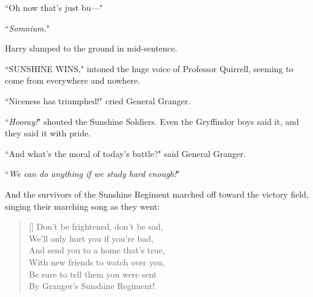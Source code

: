 ``Oh now that's just bu—"

``\emph{Somnium.}"

Harry slumped to the ground in mid-sentence.

``SUNSHINE WINS," intoned the huge voice of Professor Quirrell, seeming to come from everywhere and nowhere.

``Niceness has triumphed!" cried General Granger.

``\emph{Hooray!}" shouted the Sunshine Soldiers. Even the Gryffindor boys said it, and they said it with pride.

``And what's the moral of today's battle?" said General Granger.

``\emph{We can do anything if we study hard enough!}"

And the survivors of the Sunshine Regiment marched off toward the victory field, singing their marching song as they went:

\baselineskip\settowidth{\versewidth}{And send you to a home that's true,}
\begin{verse}[\versewidth]
Don't be frightened, don't be sad,\\
We'll only hurt you if you're bad,\\
And send you to a home that's true,\\
With new friends to watch over you,\\
Be sure to tell them you were sent\\
By Granger's Sunshine Regiment!
\end{verse}

